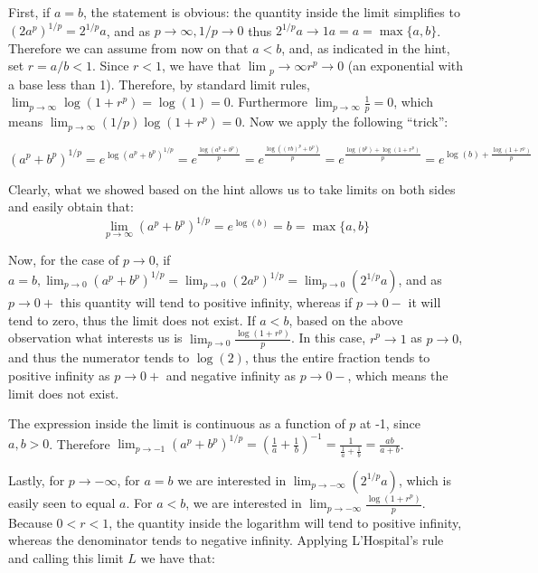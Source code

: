 \begin{solution}
    
    First, if $a = b$, the statement is obvious: the quantity inside the limit simplifies to $(2a^p)^{1/p} = 2^{1/p}a$, and as $p \rightarrow \infty, 1/p \rightarrow 0$ thus $2^{1/p}a \rightarrow 1a = a = \max\{a, b\}$.
    Therefore we can assume from now on that $a < b$, and, as indicated in the hint, set $r = a / b < 1$.
    Since $r < 1$, we have that $\lim{_p \rightarrow \infty} r^p \rightarrow 0$ (an exponential with a base less than 1).
    Therefore, by standard limit rules, $\lim_{p \rightarrow \infty} \log(1 + r^p) = \log(1) = 0$. 
    Furthermore $\lim_{p \rightarrow \infty} \frac{1}{p} = 0$, which means $\lim_{p \rightarrow \infty} (1/p)\log(1 + r^p) = 0$.
    Now we apply the following ``trick'':

    $$(a^p + b^p)^{1/p} = e^{\log(a^p + b^p)^{1/p}} = e^{\frac{\log(a^p + b^p)}{p}} = e^{\frac{\log((rb)^p + b^p)}{p}} = e^{\frac{\log(b^p) + \log(1 + r^p)}{p}} = e^{\log(b) + \frac{\log(1 + r^p)}{p}}$$
    
    Clearly, what we showed based on the hint allows us to take limits on both sides and easily obtain that:
    $$\lim_{p \rightarrow \infty}(a^p + b^p)^{1/p} = e^{\log(b)} = b = \max\{a, b\}$$

    Now, for the case of $p \rightarrow 0$, if $a = b, \lim_{p \rightarrow 0}(a^p + b^p)^{1/p} = \lim_{p \rightarrow 0}(2a^p)^{1/p} = \lim_{p \rightarrow 0}(2^{1/p}a)$, and as $p \rightarrow 0+$ this quantity will tend to positive infinity, whereas if $p \rightarrow 0-$ it will tend to zero, thus the limit does not exist.
    If $a < b$, based on the above observation what interests us is $\lim_{p \rightarrow 0} \frac{\log(1 + r^p)}{p}$.
    In this case, $r^p \rightarrow 1$ as $p \rightarrow 0$, and thus the numerator tends to $\log(2)$, thus the entire fraction tends to positive infinity as $p \rightarrow 0+$ and negative infinity as $p \rightarrow 0-$, which means the limit does not exist.

    The expression inside the limit is continuous as a function of $p$ at -1, since $a, b > 0$.
    Therefore $\lim_{p \rightarrow -1}(a^p + b^p)^{1/p} = (\frac{1}{a} + \frac{1}{b})^{-1} = \frac{1}{\frac{1}{a} + \frac{1}{b}} = \frac{ab}{a + b}$.

    Lastly, for $p \rightarrow -\infty$, for $a = b$ we are interested in $\lim_{p \rightarrow -\infty}(2^{1/p}a)$, which is easily seen to equal $a$.
    For $a < b$, we are interested in $\lim_{p \rightarrow -\infty}\frac{\log(1 + r^p)}{p}$.
    Because $0 < r < 1$, the quantity inside the logarithm will tend to positive infinity, whereas the denominator tends to negative infinity.
    Applying L'Hospital's rule and calling this limit $L$ we have that:


\end{solution}
